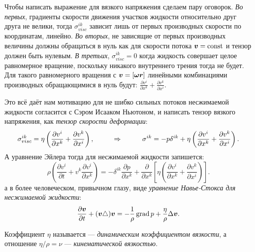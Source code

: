 Чтобы написать выражение для вязкого напряжения сделаем пару оговорок. 
\textit{Во первых}, градиенты скорости движения участков жидкости относительно друг друга не велики, тогда $\sigma^{i k}_{visc}$ зависит лишь от первых производных скорости по координатам, линейно. \textit{Во вторых}, не зависящие от первых производных величины должны обращаться в нуль как для скорости потока $\mbox{\boldmath $v$} = \text{const}$ и тензор должен быть нулевым. \textit{В третьих}, $\sigma^{i k}_{visc} = 0$ когда жидкость совершает целое равномерное вращение, поскольку никакого внутреннего трения тогда не будет.
Для такого равномерного вращения с $\mbox{\boldmath $v$} = [\mbox{\boldmath $\omega$} \mbox{\boldmath $r$}]$ линейными комбинациями производных обращающимися в нуль будут: $\frac{\partial v^i}{\partial x^k} + \frac{\partial v^k}{\partial x^i}$.

Это всё даёт нам мотивацию для не шибко сильных потоков несжимаемой жидкости согласится с Сэром Исааком Ньютоном, и написать тензор вязкого напряжения, как \textit{тензор скорости деформации}:
\begin{equation*}
	\sigma^{i k}_{visc} = \eta \left(\frac{\partial v^i}{\partial x^k} + \frac{\partial v^k}{\partial x^i}\right),
	\hspace*{1 cm}
	\Rightarrow
	\hspace*{1 cm}
	\sigma^{i k} = - p \delta^{i k} + \eta \left(\frac{\partial v^i}{\partial x^k} + \frac{\partial v^k}{\partial x^i}\right).
\end{equation*}
А уравнение Эйлера тогда для несжимаемой жидкости запишется:
\begin{equation*}
	\rho \left(\frac{\partial v^i}{\partial t} + v^k \frac{\partial v^i}{\partial x^k}\right)
	=
	- \delta^{i k} \frac{\partial p}{\partial x^k} + \frac{\partial}{\partial x^k} \left[\eta \left(\frac{\partial v^i}{\partial x^k} + \frac{\partial v^k}{\partial x^i}\right)\right].
\end{equation*}
а в более человеческом, привычном глазу, виде \textit{уравнение Навье-Стокса для несжимаемой жидкости}:
\begin{equation*}
	\frac{\partial \mbox{\boldmath $v$}}{\partial t} + (\mbox{\boldmath $v$} \triangle) \mbox{\boldmath $v$} = - \frac{1}{\rho} \mathop{\mathrm{grad}}\nolimits p + \frac{\eta}{\rho} \Delta \mbox{\boldmath $v$}.
\end{equation*}
\begin{to_def}
	Коэффициент $\eta$ называется --- \textit{динамическим коэффициентом вязкости}, а отношение $\eta/\rho = \nu$ --- \textit{кинематической вязкостью}.
\end{to_def}
